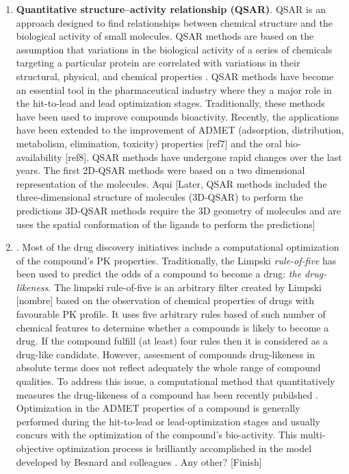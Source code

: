 \documentclass[12pt, a4paper,twoside]{tesi_upf}
\begin{document}
{\begin{enumerate}
\item \textbf{Quantitative structure–activity relationship (QSAR)}. QSAR is an approach designed to find relationships between chemical structure and the biological activity of small molecules. QSAR methods are based on the assumption that variations in the biological  activity  of  a  series  of  chemicals  targeting a particular protein are correlated  with variations in their structural, physical, and chemical properties \cite{Perkins2003}. QSAR methods have become an essential tool in the pharmaceutical industry where they a major role in the hit-to-lead and lead optimization stages. Traditionally, these methods have been used to improve compounds bioactivity. Recently, the applications have been extended to the improvement of ADMET (adsorption, distribution, metabolism, elimination, toxicity) properties [ref7] and the oral bio-availability [ref8].  QSAR  methods have undergone rapid changes over the last years. The first 2D-QSAR methods were based on a two dimensional representation of the molecules. Aqui [Later, QSAR methods included the three-dimensional structure of molecules (3D-QSAR) to perform the predictions 3D-QSAR methods require the 3D geometry of molecules and are uses the spatial conformation of the ligands to perform the predictions]
\item {}. Most of the drug discovery initiatives include a computational optimization of the compound's PK properties. Traditionally, the Limpski \textit{rule-of-five} has been used to predict the odds of a compound to become a drug: \textit{the drug-likeness}. The limpski rule-of-five is an arbitrary filter created by Limpski [nombre] based on the observation of chemical properties of drugs with favourable PK profile. It uses five arbitrary rules based of such number of chemical features to determine whether a compounds is likely to become a drug. If the compound fulfill (at least) four rules then it is considered as a drug-like candidate. However, assesment of compounds drug-likeness in absolute terms does not reflect adequately the whole range of compound qualities. To address this issue, a computational method that quantitatively measures the drug-likeness of a compound has been recently pubilshed \cite{Bickerton2012}. Optimization in the ADMET properties of a compound is generally performed during the hit-to-lead or lead-optimization stages and usually concurs with the optimization of the compound's bio-activity. This multi-objective optimization process is brilliantly accomplished in the model developed by Besnard and colleagues \cite{Besnard2012be}. Any other? [Finish] \end{enumerate}


}
\end{document}
